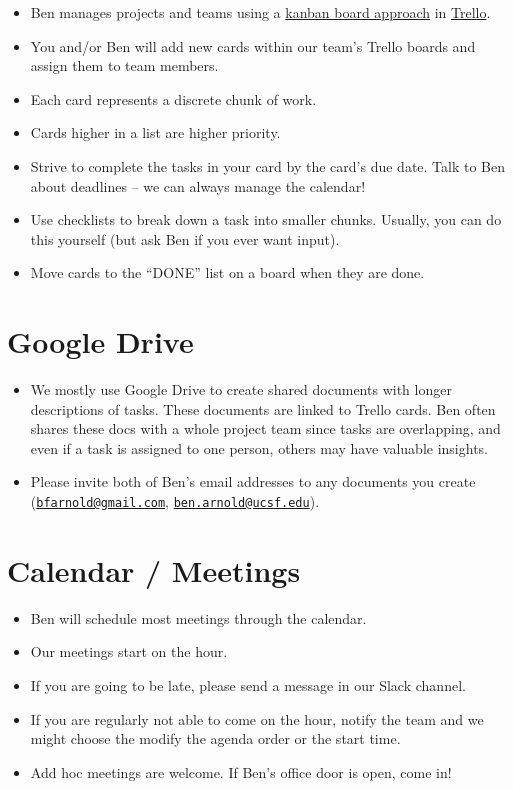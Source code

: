 \documentclass[
]{book}
\providecommand{\tightlist}{%
  \setlength{\itemsep}{0pt}\setlength{\parskip}{0pt}}
\begin{document}
\begin{itemize}
\tightlist
\item
  Ben manages projects and teams using a \href{https://www.atlassian.com/agile/kanban/boards}{kanban board approach} in \href{https://www.trello.com}{Trello}.
\item
  You and/or Ben will add new cards within our team's Trello boards and assign them to team members.
\item
  Each card represents a discrete chunk of work.
\item
  Cards higher in a list are higher priority.
\item
  Strive to complete the tasks in your card by the card's due date. Talk to Ben about deadlines -- we can always manage the calendar!
\item
  Use checklists to break down a task into smaller chunks. Usually, you can do this yourself (but ask Ben if you ever want input).
\item
  Move cards to the ``DONE'' list on a board when they are done.
\end{itemize}

\hypertarget{google-drive}{%
\section{Google Drive}\label{google-drive}}

\begin{itemize}
\tightlist
\item
  We mostly use Google Drive to create shared documents with longer descriptions of tasks. These documents are linked to Trello cards. Ben often shares these docs with a whole project team since tasks are overlapping, and even if a task is assigned to one person, others may have valuable insights.
\item
  Please invite both of Ben's email addresses to any documents you create (\href{mailto:bfarnold@gmail.com}{\nolinkurl{bfarnold@gmail.com}}, \href{mailto:ben.arnold@ucsf.edu}{\nolinkurl{ben.arnold@ucsf.edu}}).
\end{itemize}

\hypertarget{calendar-meetings}{%
\section{Calendar / Meetings}\label{calendar-meetings}}

\begin{itemize}
\tightlist
\item
  Ben will schedule most meetings through the calendar.
\item
  Our meetings start on the hour.
\item
  If you are going to be late, please send a message in our Slack channel.
\item
  If you are regularly not able to come on the hour, notify the team and we might choose the modify the agenda order or the start time.
\item
  Add hoc meetings are welcome. If Ben's office door is open, come in!
\end{itemize}
\end{document}
